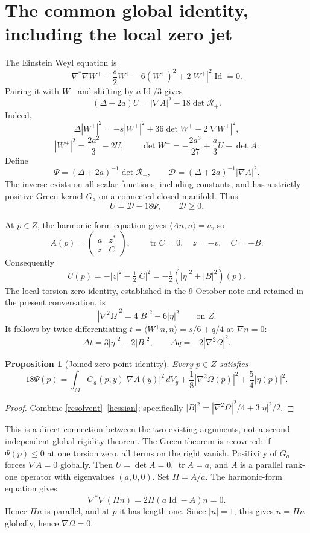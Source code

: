 \documentclass[11pt]{article}
\newtheorem{proposition}{Proposition}[section]
\newcommand{\tr}{\operatorname{tr}}
\newcommand{\Id}{\operatorname{Id}}
\newcommand{\RR}{\mathcal R_+}
\begin{document}
\section{The common global identity, including the local zero jet}
The Einstein Weyl equation is
\[
\nabla^*\nabla W^++\frac s2 W^+-6(W^+)^2+2|W^+|^2\Id=0.
\]
Pairing it with $W^+$ and shifting by $a\Id/3$ gives
\begin{equation}\label{scalar}
(\Delta+2a)U=|\nabla A|^2-18\det\RR.
\end{equation}
Indeed,
\[
\Delta|W^+|^2=-s|W^+|^2+36\det W^+-2|\nabla W^+|^2,
\]
\[
|W^+|^2=\frac{2a^2}{3}-2U,
\qquad \det W^+=-\frac{2a^3}{27}+\frac a3U-\det A.
\]
Define
\[
\Psi=(\Delta+2a)^{-1}\det\RR,\qquad
\mathcal D=(\Delta+2a)^{-1}|\nabla A|^2.
\]
The inverse exists on all scalar functions, including constants, and
has a strictly positive Green kernel $G_a$ on a connected closed manifold.
Thus
\begin{equation}\label{resolvent}
U=\mathcal D-18\Psi,\qquad \mathcal D\ge0.
\end{equation}

At $p\in Z$, the harmonic-form equation gives
$\langle An,n\rangle=a$, so
\[
A(p)=\begin{pmatrix}a&z^*\\z&C\end{pmatrix},\qquad
\tr C=0,\quad z=-v,\quad C=-B.
\]
Consequently
\begin{equation}\label{zerou}
U(p)=-|z|^2-\tfrac12|C|^2
     =-\tfrac12(|\eta|^2+|B|^2)(p).
\end{equation}
The local torsion-zero identity, established in the 9 October note and
retained in the present conversation, is
\begin{equation}\label{hessian}
|\nabla^2\Omega|^2=4|B|^2-6|\eta|^2
\qquad\text{on }Z.
\end{equation}
It follows by twice differentiating
$t=\langle W^+n,n\rangle=s/6+q/4$ at $\nabla n=0$:
\[
\Delta t=3|\eta|^2-2|B|^2,
\qquad \Delta q=-2|\nabla^2\Omega|^2.
\]

\begin{proposition}[Joined zero-point identity]\label{joined}
Every $p\in Z$ satisfies
\begin{equation}\label{master}
\boxed{18\Psi(p)=
\int_MG_a(p,y)|\nabla A(y)|^2\,dV_y
+\frac18|\nabla^2\Omega(p)|^2+\frac54|\eta(p)|^2.}
\end{equation}
\end{proposition}
\begin{proof}
Combine \eqref{resolvent}--\eqref{hessian}; specifically
$|B|^2=|\nabla^2\Omega|^2/4+3|\eta|^2/2$.
\end{proof}
This is a direct connection between the two existing arguments, not a
second independent global rigidity theorem. The Green theorem is recovered:
if $\Psi(p)\le0$ at one torsion zero, all terms on the right vanish.
Positivity of $G_a$ forces $\nabla A=0$ globally. Then $U=\det A=0$,
$\tr A=a$, and $A$ is a parallel rank-one operator with eigenvalues
$(a,0,0)$. Set $\Pi=A/a$. The harmonic-form equation gives
\[
\nabla^*\nabla(\Pi n)=2\Pi(a\Id-A)n=0.
\]
Hence $\Pi n$ is parallel, and at $p$ it has length one. Since $|n|=1$,
this gives $n=\Pi n$ globally, hence $\nabla\Omega=0$.
\end{document}
